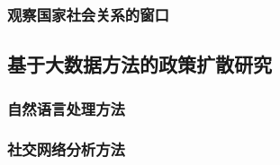 \documentclass[
  12pt,
]{ctexart}
\begin{document}
\hypertarget{ux89c2ux5bdfux56fdux5bb6ux793eux4f1aux5173ux7cfbux7684ux7a97ux53e3}{%
\subsubsection{观察国家社会关系的窗口}\label{ux89c2ux5bdfux56fdux5bb6ux793eux4f1aux5173ux7cfbux7684ux7a97ux53e3}}

\hypertarget{ux57faux4e8eux5927ux6570ux636eux65b9ux6cd5ux7684ux653fux7b56ux6269ux6563ux7814ux7a76}{%
\subsection{基于大数据方法的政策扩散研究}\label{ux57faux4e8eux5927ux6570ux636eux65b9ux6cd5ux7684ux653fux7b56ux6269ux6563ux7814ux7a76}}

\hypertarget{ux81eaux7136ux8bedux8a00ux5904ux7406ux65b9ux6cd5}{%
\subsubsection{自然语言处理方法}\label{ux81eaux7136ux8bedux8a00ux5904ux7406ux65b9ux6cd5}}

\hypertarget{ux793eux4ea4ux7f51ux7edcux5206ux6790ux65b9ux6cd5}{%
\subsubsection{社交网络分析方法}\label{ux793eux4ea4ux7f51ux7edcux5206ux6790ux65b9ux6cd5}}
\end{document}

